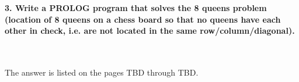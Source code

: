 \documentclass{article}
\begin{document}
\paragraph{}\
\paragraph{}\
\paragraph{}\


	
	\rmfamily
	
	\paragraph{3. Write a PROLOG program that solves the 8 queens problem (location of 8 queens on a chess board so that no queens have each other in check, i.e. are not located in the same row/column/diagonal). }\
	\newline
	\rmfamily\
	
	The answer is listed on the pages TBD through TBD.
	
	

		
\end{document}
